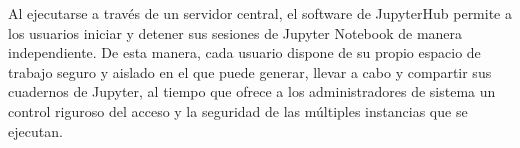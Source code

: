 \begin{spacing}{1.5}
    Al ejecutarse a través de un servidor central, el software de JupyterHub permite a los usuarios iniciar y detener sus sesiones de Jupyter Notebook de manera independiente. De esta manera, cada usuario dispone de su propio espacio de trabajo seguro y aislado en el que puede generar, llevar a cabo y compartir sus cuadernos de Jupyter, al tiempo que ofrece a los administradores de sistema un control riguroso del acceso y la seguridad de las múltiples instancias que se ejecutan.

  \mylinespacing
  \mylinespacing
  \begin{tightcenter}
  \end{tightcenter}
\end{spacing}

